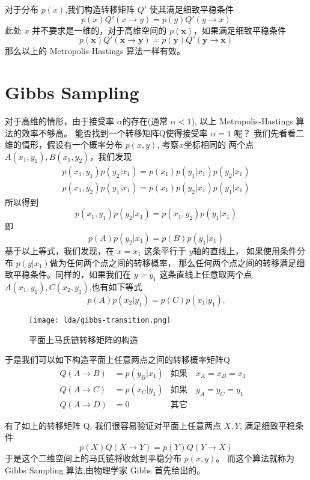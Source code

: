 对于分布 $p(x)$,我们构造转移矩阵 $Q'$ 使其满足细致平稳条件
$$ p(x) Q'(x\rightarrow y) = p(y) Q'(y\rightarrow x) $$
此处 $x$ 并不要求是一维的，对于高维空间的 $p(\mathbf{x})$，如果满足细致平稳条件
$$ p(\mathbf{x}) Q'(\mathbf{x}\rightarrow \mathbf{y})
= p(\mathbf{y}) Q'(\mathbf{y}\rightarrow \mathbf{x}) $$
那么以上的 Metropolis-Hastings 算法一样有效。

\section{Gibbs Sampling}
对于高维的情形，由于接受率 $\alpha$的存在(通常 $\alpha < 1$), 以上 Metropolis-Hastings 算法的效率不够高。
能否找到一个转移矩阵Q使得接受率 $\alpha=1$ 呢？
我们先看看二维的情形，假设有一个概率分布 $p(x,y)$, 考察$x$坐标相同的
两个点$A(x_1,y_1), B(x_1,y_2)$，我们发现
\begin{align*}
p(x_1,y_1)p(y_2|x_1) = p(x_1)p(y_1|x_1)p(y_2|x_1) \\
p(x_1,y_2)p(y_1|x_1) = p(x_1)p(y_2|x_1)p(y_1|x_1)
\end{align*}
所以得到
\begin{equation}
\label{gibbs-detailed-balance}
 p(x_1,y_1)p(y_2|x_1) =  p(x_1,y_2)p(y_1|x_1)
\end{equation}
即
$$ p(A)p(y_2|x_1) =  p(B)p(y_1|x_1) $$
基于以上等式，我们发现，在 $x=x_1$ 这条平行于 $y$轴的直线上，
如果使用条件分布 $p(y|x_1)$做为任何两个点之间的转移概率，
那么任何两个点之间的转移满足细致平稳条件。同样的，如果我们在 $y=y_1$ 这条直线上任意取两个点
$A(x_1,y_1), C(x_2,y_1)$,也有如下等式
$$ p(A)p(x_2|y_1) =  p(C)p(x_1|y_1). $$

\begin{figure}[h]
\centering
\texttt{[image: lda/gibbs-transition.png]}
\caption{平面上马氏链转移矩阵的构造}
\end{figure}

于是我们可以如下构造平面上任意两点之间的转移概率矩阵Q
\begin{align*}
Q(A\rightarrow B) & = p(y_B|x_1) & \text{如果} \quad x_A=x_B=x_1 & \\
Q(A\rightarrow C) & = p(x_C|y_1) & \text{如果} \quad y_A=y_C=y_1 & \\
Q(A\rightarrow D) & = 0          & \text{其它} &
\end{align*}


有了如上的转移矩阵 Q, 我们很容易验证对平面上任意两点 $X,Y$, 满足细致平稳条件
$$ p(X)Q(X\rightarrow Y) = p(Y) Q(Y\rightarrow X) $$
于是这个二维空间上的马氏链将收敛到平稳分布 $p(x,y)$。
而这个算法就称为 Gibbs Sampling 算法,由物理学家 Gibbs 首先给出的。

